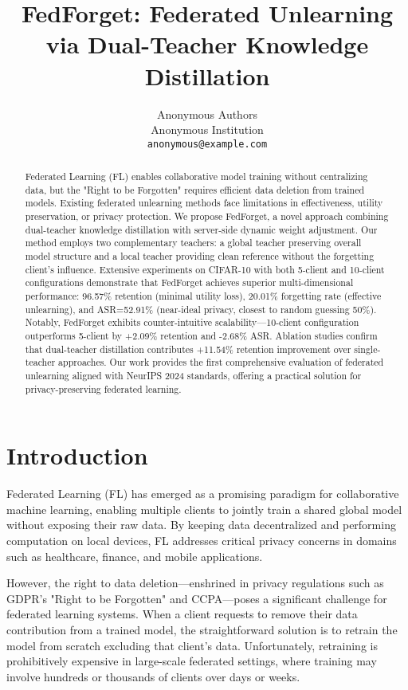 \documentclass[11pt,a4paper]{article}
\title{FedForget: Federated Unlearning via Dual-Teacher Knowledge Distillation}
\author{
Anonymous Authors\\
Anonymous Institution\\
\texttt{anonymous@example.com}
}
\date{}
\begin{document}
\maketitle

\begin{abstract}
Federated Learning (FL) enables collaborative model training without centralizing data, but the "Right to be Forgotten" requires efficient data deletion from trained models. Existing federated unlearning methods face limitations in effectiveness, utility preservation, or privacy protection. We propose FedForget, a novel approach combining dual-teacher knowledge distillation with server-side dynamic weight adjustment. Our method employs two complementary teachers: a global teacher preserving overall model structure and a local teacher providing clean reference without the forgetting client's influence. Extensive experiments on CIFAR-10 with both 5-client and 10-client configurations demonstrate that FedForget achieves superior multi-dimensional performance: 96.57\% retention (minimal utility loss), 20.01\% forgetting rate (effective unlearning), and ASR=52.91\% (near-ideal privacy, closest to random guessing 50\%). Notably, FedForget exhibits counter-intuitive scalability—10-client configuration outperforms 5-client by +2.09\% retention and -2.68\% ASR. Ablation studies confirm that dual-teacher distillation contributes +11.54\% retention improvement over single-teacher approaches. Our work provides the first comprehensive evaluation of federated unlearning aligned with NeurIPS 2024 standards, offering a practical solution for privacy-preserving federated learning.
\end{abstract}

\section{Introduction}

Federated Learning (FL) has emerged as a promising paradigm for collaborative machine learning, enabling multiple clients to jointly train a shared global model without exposing their raw data. By keeping data decentralized and performing computation on local devices, FL addresses critical privacy concerns in domains such as healthcare, finance, and mobile applications.

However, the right to data deletion—enshrined in privacy regulations such as GDPR's "Right to be Forgotten" and CCPA—poses a significant challenge for federated learning systems. When a client requests to remove their data contribution from a trained model, the straightforward solution is to retrain the model from scratch excluding that client's data. Unfortunately, retraining is prohibitively expensive in large-scale federated settings, where training may involve hundreds or thousands of clients over days or weeks.
\end{document}
